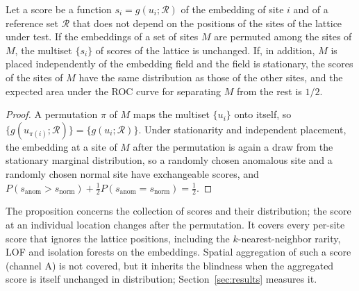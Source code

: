 \begin{proposition}
\label{prop:perm}
Let a score be a function $s_i=g(u_i;\mathcal{R})$ of the embedding of site $i$ and of a reference set $\mathcal{R}$ that does not depend on the positions of the sites of the lattice under test. If the embeddings of a set of sites $M$ are permuted among the sites of $M$, the multiset $\{s_i\}$ of scores of the lattice is unchanged. If, in addition, $M$ is placed independently of the embedding field and the field is stationary, the scores of the sites of $M$ have the same distribution as those of the other sites, and the expected area under the ROC curve for separating $M$ from the rest is $1/2$.
\end{proposition}
\begin{proof}
A permutation $\pi$ of $M$ maps the multiset $\{u_i\}$ onto itself, so $\{g(u_{\pi(i)};\mathcal{R})\}=\{g(u_i;\mathcal{R})\}$. Under stationarity and independent placement, the embedding at a site of $M$ after the permutation is again a draw from the stationary marginal distribution, so a randomly chosen anomalous site and a randomly chosen normal site have exchangeable scores, and $P(s_{\mathrm{anom}}>s_{\mathrm{norm}})+\tfrac12P(s_{\mathrm{anom}}=s_{\mathrm{norm}})=\tfrac12$.
\end{proof}
The proposition concerns the collection of scores and their distribution; the score at an individual location changes after the permutation. It covers every per-site score that ignores the lattice positions, including the $k$-nearest-neighbor rarity, LOF \citep{Breunig2000} and isolation forests \citep{Liu2008} on the embeddings. Spatial aggregation of such a score (channel A) is not covered, but it inherits the blindness when the aggregated score is itself unchanged in distribution; Section~\ref{sec:results} measures it.

